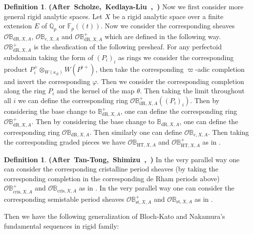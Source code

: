 \documentclass[12pt]{amsart}
\theoremstyle{definition}
\newtheorem{definition}[theorem]{Definition}
\numberwithin{equation}{section}
\begin{document}
\begin{definition} \mbox{\bf{(After Scholze, Kedlaya-Liu \cite[Definition 6.8]{Sch1}, \cite[Definition 8.6.5]{KL16})}}
Now we first consider more general rigid analytic spaces.  Let $X$ be a rigid analytic space over a finite extension $E$ of $\mathbb{Q}_p$ or $\mathbb{F}_p((t))$. Now we consider the corresponding sheaves $\mathcal{O}\mathbb{B}_{\mathrm{dR},X,A}$, $\mathcal{O}\mathbb{B}_{e,X,A}$ and $\mathcal{O}\mathbb{B}^+_{\mathrm{dR},X,A}$ which are defined in the following way. $\mathcal{O}\mathbb{B}^+_{\mathrm{dR},X,A}$ is the sheafication of the following presheaf. For any perfectoid subdomain taking the form of $(P_i)_i$ as rings we consider the corresponding product $P^+_i\otimes_{W(\kappa_E)}W(P^{\flat+})$, then take the corresponding $\varpi$-adic completion and invert the corresponding $\varphi$. Then we consider the corresponding completion along the ring $P_i$ and the kernel of the map $\theta$. Then taking the limit throughout all $i$ we can define the corresponding ring $\mathcal{O}\mathbb{B}^+_{\mathrm{dR},X,A}((P_i)_i)$. Then by considering the base change to $\mathbb{B}^+_{\mathrm{dR},X,A}$, one can define the corresponding ring $\mathcal{O}\mathbb{B}^+_{\mathrm{dR},X,A}$. Then by considering the base change to $\mathbb{B}_{\mathrm{dR},X,A}$, one can define the corresponding ring $\mathcal{O}\mathbb{B}_{\mathrm{dR},X,A}$. Then similarly one can define $\mathcal{O}\mathbb{B}_{e,X,A}$. Then taking the corresponding graded pieces we have $\mathcal{O}\mathbb{B}_{\mathrm{HT},X,A}$ and $\mathcal{O}\mathbb{B}^+_{\mathrm{HT},X,A}$ as in \cite[Definition 8.6.5]{KL16}. 
\end{definition}



\begin{definition} \mbox{\bf{(After Tan-Tong, Shimizu \cite[Section 2.1]{TT}, \cite[Section 2]{Shi})}}
In the very parallel way one can consider the corresponding cristalline period sheaves (by taking the corresponding completion in the corresponding de Rham periods above) $\mathcal{O}\mathbb{B}^+_{\mathrm{cris},X,A}$ and $\mathcal{O}\mathbb{B}_{\mathrm{cris},X,A}$ as in \cite[Section 2.1]{TT}. In the very parallel way one can consider the corresponding semistable period sheaves $\mathcal{O}\mathbb{B}^+_{\mathrm{st},X,A}$ and $\mathcal{O}\mathbb{B}_{\mathrm{st},X,A}$ as in \cite[Section 2]{Shi}.
\end{definition}


\indent Then we have the following generalization of Bloch-Kato \cite{BK1} and Nakamura's \cite{Nakamura1} fundamental sequences in rigid family:
\end{document}

